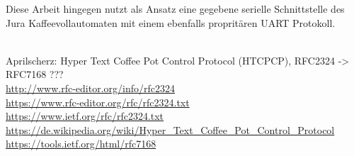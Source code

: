 Diese Arbeit hingegen nutzt als Ansatz eine gegebene serielle Schnittstelle des Jura Kaffeevollautomaten mit einem ebenfalls propritären \ac{UART} Protokoll.

\todo\\
Aprilscherz: Hyper Text Coffee Pot Control Protocol (HTCPCP), RFC2324 -> RFC7168 ???\\
\href{http://www.rfc-editor.org/info/rfc2324}{http://www.rfc-editor.org/info/rfc2324}\\
\href{https://www.rfc-editor.org/rfc/rfc2324.txt}{https://www.rfc-editor.org/rfc/rfc2324.txt}\\
\href{https://www.ietf.org/rfc/rfc2324.txt}{https://www.ietf.org/rfc/rfc2324.txt}\\
\href{https://de.wikipedia.org/wiki/Hyper_Text_Coffee_Pot_Control_Protocol}{https://de.wikipedia.org/wiki/Hyper\_Text\_Coffee\_Pot\_Control\_Protocol}\\
\href{https://tools.ietf.org/html/rfc7168}{https://tools.ietf.org/html/rfc7168}\\
